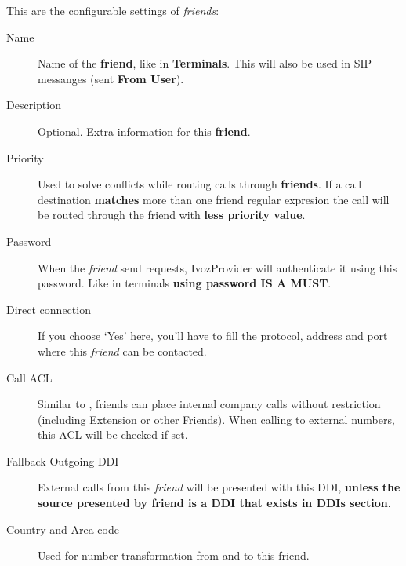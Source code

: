 \documentclass[letterpaper,10pt,english]{sphinxmanual}
\begin{document}
This are the configurable settings of \emph{friends}:
\begin{description}
\item[{Name}] \leavevmode{}\label{company/friends:term-name}
Name of the \textbf{friend}, like in \textbf{Terminals}. This will also be used
in SIP messanges (sent \textbf{From User}).

\item[{Description}] \leavevmode{}\label{company/friends:term-description}
Optional. Extra information for this \textbf{friend}.

\item[{Priority}] \leavevmode{}\label{company/friends:term-priority}
Used to solve conflicts while routing calls through \textbf{friends}.
If a call destination \textbf{matches} more than one friend regular expresion
the call will be routed through the friend with \textbf{less priority value}.

\item[{Password}] \leavevmode{}\label{company/friends:term-password}
When the \emph{friend} send requests, IvozProvider will authenticate it using
this password. Like in terminals \textbf{using password IS A MUST}.

\item[{Direct connection}] \leavevmode{}\label{company/friends:term-direct-connection}
If you choose `Yes' here, you'll have to fill the protocol, address and
port where this \emph{friend} can be contacted.

\item[{Call ACL}] \leavevmode{}\label{company/friends:term-call-acl}
Similar to {\hyperref[company/users:users]{}}, friends can place internal
company calls without restriction (including Extension or other Friends).
When calling to external numbers, this ACL will be checked if set.

\item[{Fallback Outgoing DDI}] \leavevmode{}\label{company/friends:term-fallback-outgoing-ddi}
External calls from this \emph{friend} will be presented with this DDI, \textbf{unless
the source presented by friend is a DDI that exists in DDIs section}.

\item[{Country and Area code}] \leavevmode{}\label{company/friends:term-country-and-area-code}
Used for number transformation from and to this friend.


\end{description}
\end{document}
